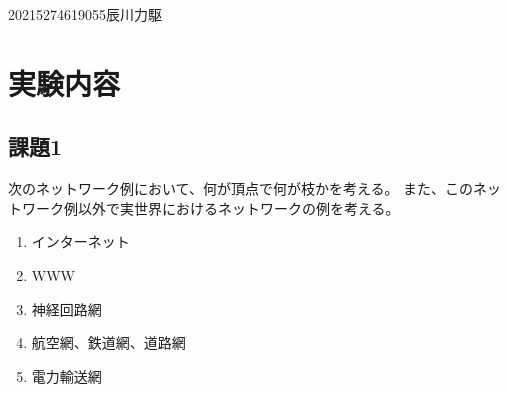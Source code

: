 \documentclass[12pt]{jarticle}
\begin{document}
{2021}{5}{27}{4619055}{辰川力駆}
\section{実験内容}
\subsection{課題1}
次のネットワーク例において、何が頂点で何が枝かを考える。
また、このネットワーク例以外で実世界におけるネットワークの例を考える。
\begin{enumerate}
    \item インターネット
    \item WWW
    \item 神経回路網
    \item 航空網、鉄道網、道路網
    \item 電力輸送網
\end{enumerate}
\end{document}
